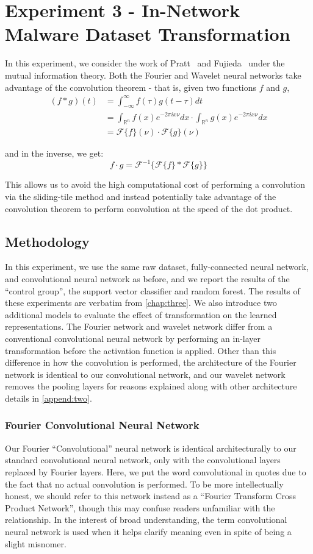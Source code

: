 \chapter{Experiment 3 - In-Network Malware Dataset Transformation}
\label{chap:four}

In this experiment, we consider the work of Pratt~\cite{pratt2017fcnn} and Fujieda~\cite{fujieda2017wavelet} under the mutual information theory.
Both the Fourier and Wavelet neural networks take advantage of the convolution theorem - that is, given two functions $f$ and $g$,
\begin{align}
(f * g)(t) & = \int_{-\infty}^{\infty} f(\tau)g(t-\tau)dt \\
& = \int_{\mathbb{R}^n}f(x) e^{-2\pi i x \nu} dx	 \cdot \int_{\mathbb{R}^n}g(x) e^{-2\pi i x \nu} dx\\	
& = \mathcal{F}\{f\}(\nu) \cdot \mathcal{F}\{g\}(\nu)
\end{align}

and in the inverse, we get:
$$f \cdot g = \mathcal{F}^{-1}\{\mathcal{F}\{f\} * \mathcal{F}\{g\}\}$$

This allows us to avoid the high computational cost of performing a convolution via the sliding-tile method and instead potentially take advantage of the convolution theorem to perform convolution at the speed of the dot product.

\section{Methodology}
In this experiment, we use the same raw dataset, fully-connected neural network, and convolutional neural network as before, and we report the results of the ``control group'', the support vector classifier and random forest.
The results of these experiments are verbatim from \ref{chap:three}.
We also introduce two additional models to evaluate the effect of transformation on the learned representations.
The Fourier network and wavelet network differ from a conventional convolutional neural network by performing an in-layer transformation before the activation function is applied. 
Other than this difference in how the convolution is performed, the architecture of the Fourier network is identical to our convolutional network, and our wavelet network removes the pooling layers for reasons explained along with other architecture details in \ref{append:two}.


\subsection{Fourier Convolutional Neural Network}
Our Fourier ``Convolutional'' neural network is identical architecturally to our standard convolutional neural network, only with the convolutional layers replaced by Fourier layers.
Here, we put the word convolutional in quotes due to the fact that no actual convolution is performed.
To be more intellectually honest, we should refer to this network instead as a ``Fourier Transform Cross Product Network'', though this may confuse readers unfamiliar with the relationship.
In the interest of broad understanding, the term convolutional neural network is used when it helps clarify meaning even in spite of being a slight misnomer.

